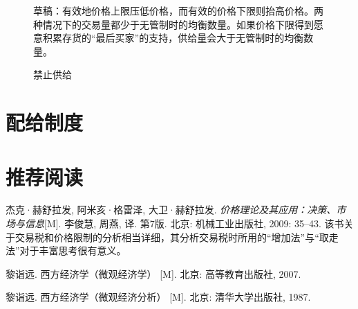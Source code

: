 \begin{figure}[!h]
\begin{shaded*}
  \begin{minipage}[t]{0.5\linewidth} 
    \centering 
	    \vspace{0pt}

  \end{minipage}%
  \begin{minipage}[t]{0.5\linewidth} 
	    \vspace{55pt}
	\caption{禁止供给}
	\label{fig:interdicting-supply}
{\kaishu\small 草稿：有效地价格上限压低价格，而有效的价格下限则抬高价格。两种情况下的交易量都少于无管制时的均衡数量。如果价格下限得到愿意积累存货的“最后买家”的支持，供给量会大于无管制时的均衡数量。}
  \end{minipage} 
\end{shaded*}
\end{figure}

\section{配给制度}

\section*{推荐阅读}

\begin{asparaenum}
\item 杰克·赫舒拉发, 阿米亥·格雷泽, 大卫·赫舒拉发. {\itshape 价格理论及其应用：决策、市场与信息}[M]. 李俊慧, 周燕, 译. 第7版. 北京: 机械工业出版社, 2009: 35--43. {}  {\kaishu 该书关于交易税和价格限制的分析相当详细，其分析交易税时所用的“增加法”与“取走法”对于丰富思考很有意义。}
\item 黎诣远. {\kaishu 西方经济学（微观经济学）} [M]. 北京: 高等教育出版社, 2007.
\item 黎诣远. {\kaishu 西方经济学（微观经济分析）} [M]. 北京: 清华大学出版社, 1987.
\end{asparaenum}

%


